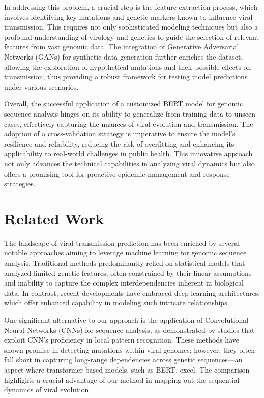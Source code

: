 \documentclass{article}
\begin{document}
In addressing this problem, a crucial step is the feature extraction process, which involves identifying key mutations and genetic markers known to influence viral transmission. This requires not only sophisticated modeling techniques but also a profound understanding of virology and genetics to guide the selection of relevant features from vast genomic data. The integration of Generative Adversarial Networks (GANs) for synthetic data generation further enriches the dataset, allowing the exploration of hypothetical mutations and their possible effects on transmission, thus providing a robust framework for testing model predictions under various scenarios.

Overall, the successful application of a customized BERT model for genomic sequence analysis hinges on its ability to generalize from training data to unseen cases, effectively capturing the nuances of viral evolution and transmission. The adoption of a cross-validation strategy is imperative to ensure the model's resilience and reliability, reducing the risk of overfitting and enhancing its applicability to real-world challenges in public health. This innovative approach not only advances the technical capabilities in analyzing viral dynamics but also offers a promising tool for proactive epidemic management and response strategies.

\section{Related Work}
The landscape of viral transmission prediction has been enriched by several notable approaches aiming to leverage machine learning for genomic sequence analysis. Traditional methods predominantly relied on statistical models that analyzed limited genetic features, often constrained by their linear assumptions and inability to capture the complex interdependencies inherent in biological data. In contrast, recent developments have embraced deep learning architectures, which offer enhanced capability in modeling such intricate relationships. 

One significant alternative to our approach is the application of Convolutional Neural Networks (CNNs) for sequence analysis, as demonstrated by studies that exploit CNN's proficiency in local pattern recognition. These methods have shown promise in detecting mutations within viral genomes; however, they often fall short in capturing long-range dependencies across genetic sequences—an aspect where transformer-based models, such as BERT, excel. The comparison highlights a crucial advantage of our method in mapping out the sequential dynamics of viral evolution.
\end{document}
